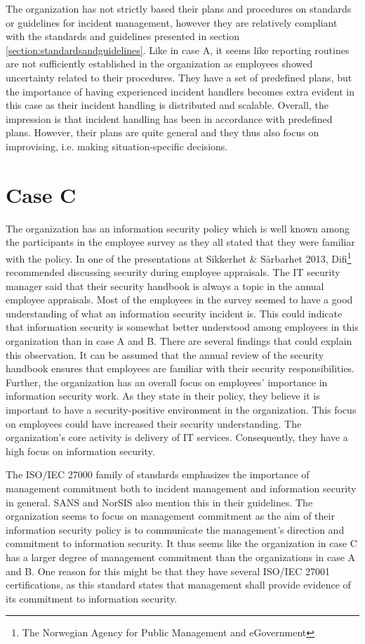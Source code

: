 The organization has not strictly based their plans and procedures on standards or guidelines for incident management, however they are relatively compliant with the standards and guidelines presented in section \ref{section:standardsandguidelines}. Like in case A, it seems like reporting routines are not sufficiently established in the organization as employees showed uncertainty related to their procedures. They have a set of predefined plans, but the importance of having experienced incident handlers becomes extra evident in this case as their incident handling is distributed and scalable. Overall, the impression is that incident handling has been in accordance with predefined plans. However, their plans are quite general and they thus also focus on improvising, i.e. making situation-specific decisions. 

\section{Case C}
\label{sec:discussionCaseC}
The organization has an information security policy which is well known among the participants in the employee survey as they all stated that they were familiar with the policy. In one of the presentations at Sikkerhet \& S\aa rbarhet 2013, Difi\footnote{The Norwegian Agency for Public Management and eGovernment} recommended discussing security during employee appraisals. The IT security manager said that their security handbook is always a topic in the annual employee appraisals. Most of the employees in the survey seemed to have a good understanding of what an information security incident is. This could indicate that information security is somewhat better understood among employees in this organization than in case A and B. There are several findings that could explain this observation. It can be assumed that the annual review of the security handbook ensures that employees are familiar with their security responsibilities. Further, the organization has an overall focus on employees' importance in information security work. As they state in their policy, they believe it is important to have a security-positive environment in the organization. This focus on employees could have increased their security understanding. The organization's core activity is delivery of IT services. Consequently, they have a high focus on information security.

The ISO/IEC 27000 family of standards emphasizes the importance of management commitment both to incident management and information security in general. SANS and NorSIS also mention this in their guidelines. The organization seems to focus on management commitment as the aim of their information security policy is to communicate the management's direction and commitment to information security. It thus seems like the organization in case C has a larger degree of management commitment than the organizations in case A and B. One reason for this might be that they have several ISO/IEC 27001 certifications, as this standard states that management shall provide evidence of its commitment to information security.

